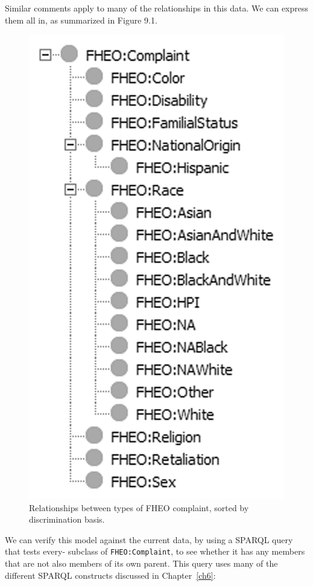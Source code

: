 Similar comments apply to many of the relationships in this data. We can
express them all in, as summarized in Figure 9.1.

\begin{figure}
\centering
\includegraphics[width=5in]{media/ch10/f10-01.png}
\caption{Relationships between types of FHEO complaint, sorted by discrimination basis.}
\label{fig:ch7.1}
\end{figure}



We can verify this model against the current data, by using a SPARQL
query that tests every- subclass of \texttt{FHEO:Complaint}, to see whether it
has any members that are not also members of its own parent. This query
uses many of the different SPARQL constructs discussed in Chapter~\ref{ch6}:

